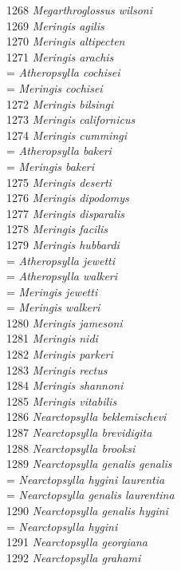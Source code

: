 \documentclass[
]{article}
\begin{document}
1268 \emph{Megarthroglossus wilsoni}\\
1269 \emph{Meringis agilis}\\
1270 \emph{Meringis altipecten}\\
1271 \emph{Meringis arachis}\\
= \emph{Atheropsylla cochisei}\\
= \emph{Meringis cochisei}\\
1272 \emph{Meringis bilsingi}\\
1273 \emph{Meringis californicus}\\
1274 \emph{Meringis cummingi}\\
= \emph{Atheropsylla bakeri}\\
= \emph{Meringis bakeri}\\
1275 \emph{Meringis deserti}\\
1276 \emph{Meringis dipodomys}\\
1277 \emph{Meringis disparalis}\\
1278 \emph{Meringis facilis}\\
1279 \emph{Meringis hubbardi}\\
= \emph{Atheropsylla jewetti}\\
= \emph{Atheropsylla walkeri}\\
= \emph{Meringis jewetti}\\
= \emph{Meringis walkeri}\\
1280 \emph{Meringis jamesoni}\\
1281 \emph{Meringis nidi}\\
1282 \emph{Meringis parkeri}\\
1283 \emph{Meringis rectus}\\
1284 \emph{Meringis shannoni}\\
1285 \emph{Meringis vitabilis}\\
1286 \emph{Nearctopsylla beklemischevi}\\
1287 \emph{Nearctopsylla brevidigita}\\
1288 \emph{Nearctopsylla brooksi}\\
1289 \emph{Nearctopsylla genalis genalis}\\
= \emph{Nearctopsylla hygini laurentia}\\
= \emph{Nearctopsylla genalis laurentina}\\
1290 \emph{Nearctopsylla genalis hygini}\\
= \emph{Nearctopsylla hygini}\\
1291 \emph{Nearctopsylla georgiana}\\
1292 \emph{Nearctopsylla grahami}\\
\end{document}
